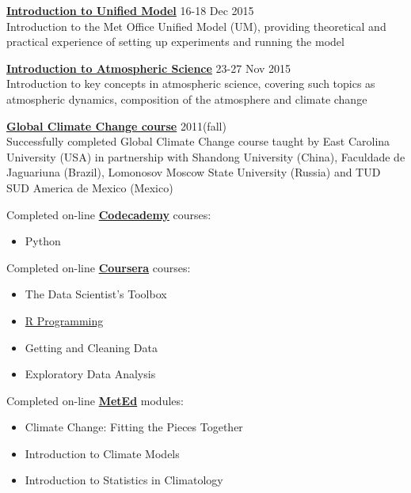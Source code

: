 \documentclass[10pt]{article}
\newenvironment{innerlist}[1][\enskip$\filledsquare$]%
        {\begin{itemize}[#1,leftmargin=*,rightmargin=1mm,parsep=0pt,itemsep=0pt,topsep=0pt,partopsep=0pt]}
        {\end{itemize}}
\begin{document}
\vspace{.1in}
\textbf{\href {https://www.ncas.ac.uk/index.php/en/nerc-ppsda-schools/introduction-to-unified-model}{Introduction to Unified Model}} \hfill {16-18 Dec 2015} \\
Introduction to the Met Office Unified Model (UM), providing theoretical and practical experience of setting up experiments and running the model

\vspace{.1in}
\textbf{\href{https://www.ncas.ac.uk/index.php/en/introduction-to-atmospheric-science-course}{Introduction to Atmospheric Science}} \hfill {23-27 Nov 2015} \\
Introduction to key concepts in atmospheric science, covering such topics as atmospheric dynamics, composition of the atmosphere and climate change

\vspace{.1in}
\textbf{\href{http://gcc.aos.ecu.edu/}{Global Climate Change course}} \hfill {2011(fall)} \\
Successfully completed Global Climate Change course taught by East Carolina University (USA) in partnership with Shandong University (China), Faculdade de Jaguariuna (Brazil), Lomonosov Moscow State University (Russia) and TUD SUD America de Mexico (Mexico)

\vspace{.1in}
Completed on-line \textbf{\href{https://www.codecademy.com/}{Codecademy}} courses:
\begin{itemize}
		\item Python
\end{itemize}

Completed on-line \textbf{\href{https://www.coursera.org/}{Coursera}} courses:
\begin{innerlist}
        \item The Data Scientist’s Toolbox
        \item \href{https://www.coursera.org/account/accomplishments/records/nuPFsbVDd55fwCAZ}{R Programming}
        \item Getting and Cleaning Data
        \item Exploratory Data Analysis
\end{innerlist}

\vspace{.1in}
Completed on-line \textbf{\href{https://www.meted.ucar.edu/}{MetEd}} modules:
\begin{innerlist}
        \item Climate Change: Fitting the Pieces Together
        \item Introduction to Climate Models
        \item Introduction to Statistics in Climatology
\end{innerlist}
\end{document}
